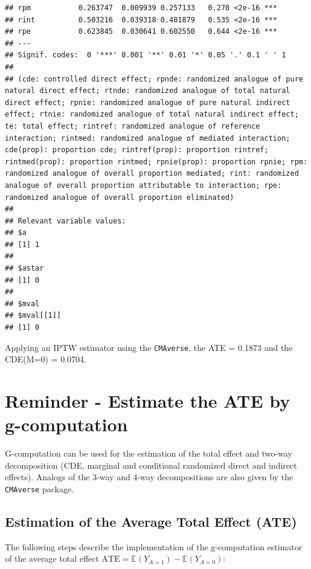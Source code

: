 \documentclass[
]{book}
\begin{document}
\begin{verbatim}
## rpm           0.263747  0.009939 0.257133   0.270 <2e-16 ***
## rint          0.503216  0.039318 0.481879   0.535 <2e-16 ***
## rpe           0.623845  0.030641 0.602550   0.644 <2e-16 ***
## ---
## Signif. codes:  0 '***' 0.001 '**' 0.01 '*' 0.05 '.' 0.1 ' ' 1
## 
## (cde: controlled direct effect; rpnde: randomized analogue of pure natural direct effect; rtnde: randomized analogue of total natural direct effect; rpnie: randomized analogue of pure natural indirect effect; rtnie: randomized analogue of total natural indirect effect; te: total effect; rintref: randomized analogue of reference interaction; rintmed: randomized analogue of mediated interaction; cde(prop): proportion cde; rintref(prop): proportion rintref; rintmed(prop): proportion rintmed; rpnie(prop): proportion rpnie; rpm: randomized analogue of overall proportion mediated; rint: randomized analogue of overall proportion attributable to interaction; rpe: randomized analogue of overall proportion eliminated)
## 
## Relevant variable values: 
## $a
## [1] 1
## 
## $astar
## [1] 0
## 
## $mval
## $mval[[1]]
## [1] 0
\end{verbatim}

Applying an IPTW estimator using the \texttt{CMAverse}, the ATE = 0.1873 and the CDE(M=0) = 0.0704.

\chapter{Reminder - Estimate the ATE by g-computation}\label{reminder---estimate-the-ate-by-g-computation}

G-computation can be used for the estimation of the total effect and two-way decomposition (CDE, marginal and conditional randomized direct and indirect effects). Analogs of the 3-way and 4-way decompositions are also given by the \texttt{CMAverse} package.

\section{Estimation of the Average Total Effect (ATE)}\label{estimation-of-the-average-total-effect-ate}

The following steps describe the implementation of the g-computation estimator of the average total effect \(\text{ATE} = \mathbb{E}(Y_{A=1}) - \mathbb{E}(Y_{A=0})\):
\end{document}
